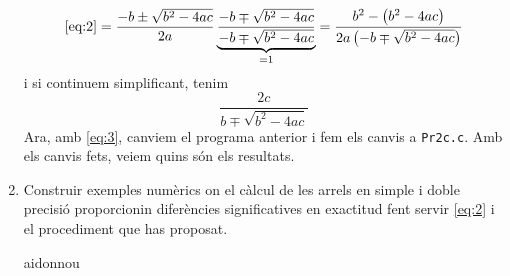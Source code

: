 \documentclass[a4paper, 12pt]{article}
\begin{document}
\begin{exercici}
\begin{enumerate}[label=\alph*)]
\begin{solucio}
                \begin{displaymath}
                    \eqref{eq:2} = \frac{-b\pm\sqrt{b^2-4ac}}{2a} \underbrace{\frac{-b \mp \sqrt{b^2-4ac}}{-b \mp \sqrt{b^2-4ac}}}_{=1} = \frac{b^2-\left(b^2-4ac\right)}{2a\left(-b\mp\sqrt{b^2-4ac}\right)}
                \end{displaymath}
                i si continuem simplificant, tenim
                \begin{equation}
                    \frac{2c}{b \mp \sqrt{b^2-4ac}}
                    \label{eq:3}
                \end{equation}
                Ara, amb \eqref{eq:3}, canviem el programa anterior i fem els canvis a \verb|Pr2c.c|.
                Amb els canvis fets, veiem quins són els resultats. 
            \end{solucio}
            \item Construir exemples numèrics on el càlcul de les arrels en simple i doble precisió
            proporcionin diferències significatives en exactitud fent servir \eqref{eq:2} i el
            procediment que has proposat.\\
            \begin{solucio}
                aidonnou
            \end{solucio}
        \end{enumerate}
    \end{exercici}
\end{document}
